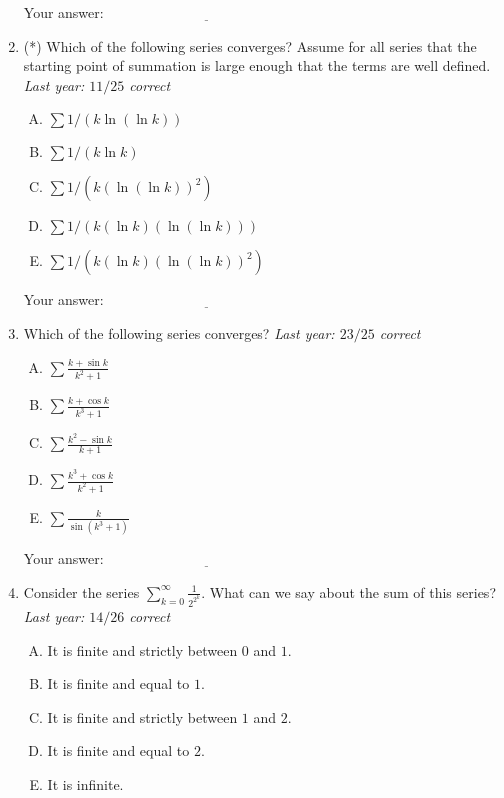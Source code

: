 \documentclass[10pt]{amsart}
\begin{document}
\begin{enumerate}
  \vspace{0.1in}
  Your answer: $\underline{\qquad\qquad\qquad\qquad\qquad\qquad\qquad}$
  \vspace{0.15in}

\item (*) Which of the following series converges? Assume for all
  series that the starting point of summation is large enough that the
  terms are well defined. {\em Last year: $11/25$ correct}

  \begin{enumerate}[(A)]
  \item $\sum 1/(k \ln (\ln k))$
  \item $\sum 1/(k \ln k)$
  \item $\sum 1/(k (\ln (\ln k))^2)$
  \item $\sum 1/(k (\ln k)(\ln (\ln k)))$
  \item $\sum 1/(k (\ln k)(\ln (\ln k))^2)$
  \end{enumerate}

  \vspace{0.1in}
  Your answer: $\underline{\qquad\qquad\qquad\qquad\qquad\qquad\qquad}$
  \vspace{0.15in}

\item Which of the following series converges? {\em Last year: $23/25$
  correct}

  \begin{enumerate}[(A)]
  \item $\sum \frac{k + \sin k}{k^2 + 1}$
  \item $\sum \frac{k + \cos k}{k^3 + 1}$
  \item $\sum \frac{k^2 - \sin k}{k + 1}$
  \item $\sum \frac{k^3 + \cos k}{k^2 + 1}$
  \item $\sum \frac{k}{\sin(k^3 + 1)}$
  \end{enumerate}

  \vspace{0.1in}
  Your answer: $\underline{\qquad\qquad\qquad\qquad\qquad\qquad\qquad}$
  \vspace{0.15in}

\item Consider the series $\sum_{k=0}^\infty \frac{1}{2^{2^k}}$. What
  can we say about the sum of this series? {\em Last year: $14/26$
  correct}

  \begin{enumerate}[(A)]
  \item It is finite and strictly between $0$ and $1$.
  \item It is finite and equal to $1$.
  \item It is finite and strictly between $1$ and $2$.
  \item It is finite and equal to $2$.
  \item It is infinite.
  \end{enumerate}


\end{enumerate}
\end{document}
